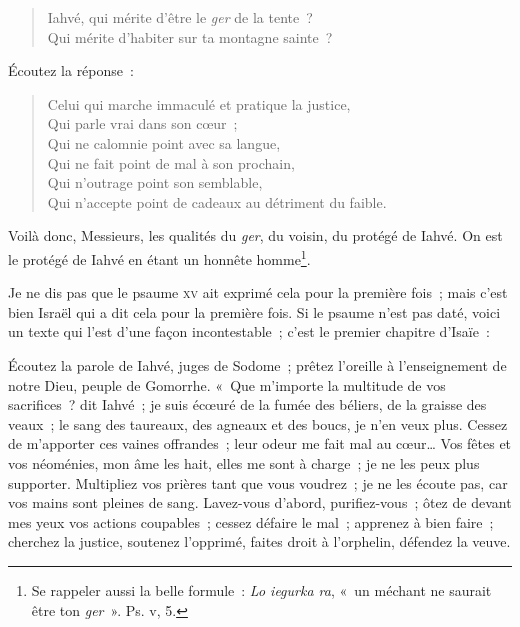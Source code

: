 \documentclass[french,twoside]{book} %
\newcommand\orgName[1]{#1}
\newcommand\persName[1]{#1}
\newcommand\placeName[1]{#1}
\newenvironment{quoteblock}%
  {\begin{quoting}}
  {\end{quoting}}
\newenvironment{quotebar}{%
    \def\FrameCommand{{\color{rubric!10!}\vrule width 0.5em} \hspace{0.9em}}%
    \def\OuterFrameSep{\itemsep} %
    \MakeFramed {\advance\hsize-\width \FrameRestore}
  }%
  {%
    \endMakeFramed
  }
\renewenvironment{quoteblock}%
  {%
    \savenotes
    \setstretch{0.9}
    \normalfont
    \begin{quotebar}
  }
  {%
    \end{quotebar}
    \spewnotes
  }
\begin{document}
\begin{verse}
{\persName Iahvé}, qui mérite d’être le {\itshape ger} de la tente ?\\
Qui mérite d’habiter sur ta montagne sainte ?\\
\end{verse}

\noindent Écoutez la réponse :\par


\begin{verse}
Celui qui marche immaculé et pratique la justice,\\
Qui parle vrai dans son cœur ;\\
Qui ne calomnie point avec sa langue,\\
Qui ne fait point de mal à son prochain,\\
Qui n’outrage point son semblable,\\
Qui n’accepte point de cadeaux au détriment du faible.\\
\end{verse}

\noindent Voilà donc, Messieurs, les qualités du {\itshape ger}, du voisin, du protégé de {\persName Iahvé}. On est le protégé de {\persName Iahvé} en étant un honnête homme\footnote{ Se rappeler aussi la belle formule : {\itshape Lo iegurka ra}, « un méchant ne saurait être ton {\itshape ger} ». Ps. v, 5.}.\par
Je ne dis pas que le psaume \textsc{xv} ait exprimé cela pour la première fois ; mais c’est bien {\orgName Israël} qui a dit cela pour la première fois. Si le psaume n’est pas daté, voici un texte qui l’est d’une façon incontestable ; c’est le premier chapitre d’Isaïe :\par

\begin{quoteblock}
 \noindent Écoutez la parole de {\persName Iahvé}, juges de {\placeName Sodome} ; prêtez l’oreille à l’enseignement de notre {\persName Dieu}, peuple de {\placeName Gomorrhe}. « Que m’importe la multitude de vos sacrifices ? dit {\persName Iahvé} ; je suis écœuré de la fumée des béliers, de la graisse des veaux ; le sang des taureaux, des agneaux et des boucs, je n’en veux plus. Cessez de m’apporter ces vaines offrandes ; leur odeur me fait mal au cœur… Vos fêtes et vos néoménies, mon âme les hait, elles me sont à charge ; je ne les peux plus supporter. Multipliez vos prières tant que vous voudrez ; je ne les écoute pas, car vos mains sont pleines de sang. Lavez-vous d’abord, purifiez-vous ; ôtez de devant mes yeux vos actions coupables ; cessez défaire le mal ; apprenez à bien faire ; cherchez la justice, soutenez l’opprimé, faites droit à l’orphelin, défendez la veuve.
 \end{quoteblock}
\end{document}
